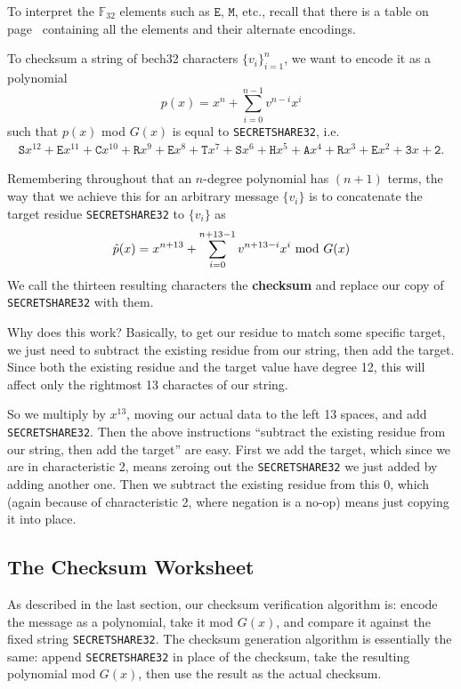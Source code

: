 \documentclass[letterpaper]{article}
\newcommand{\fttwo}{\mathbb{F}_{32}}
\newcommand{\vc}[1]{\texttt{#1}} %
\begin{document}
To interpret the $\fttwo$ elements such as $\vc{E}$, $\vc{M}$, etc., recall that
there is a table on page~\pageref{pg:f32table} containing all the elements and
their alternate encodings.

To checksum a string of bech32 characters $\{v_i\}_{i=1}^n$, we want to encode it
as a polynomial
\[ p(x) = x^n + \sum_{i=0}^{n-1} v^{n-i} x^i \]
such that $p(x)$ mod $G(x)$ is equal to \vc{SECRETSHARE32}, i.e.
\begin{align*}
\vc{S}x^{12} + \vc{E}x^{11} + \vc{C}x^{10} + \vc{R}x^9 + \vc{E}x^8 + \vc{T}x^7
    + \vc{S}x^6 + \vc{H}x^5 + \vc{A}x^4 + \vc{R}x^3 + \vc{E}x^2 + \vc{3}x + \vc{2}.
\end{align*}

Remembering throughout that an $n$-degree polynomial has $(n+1)$ terms, the way that
we achieve this for an arbitrary message $\{ v_i \}$ is to concatenate the target
residue \vc{SECRETSHARE32} to $\{ v_i \}$ as
\begin{equation}
 \hat{p}(x) = x^{n+13} + \sum_{i=0}^{n+13-1} v^{n+13-i} x^{i} \textnormal{ mod } G(x)
 \label{eq:modg}
\end{equation}
We call the thirteen resulting characters the \textbf{checksum} and replace our
copy of \vc{SECRETSHARE32} with them.

Why does this work? Basically, to get our residue to match some specific target, we
just need to subtract the existing residue from our string, then add the target. Since
both the existing residue and the target value have degree 12, this will affect only
the rightmost 13 charactes of our string.

So we multiply by $x^{13}$, moving our actual data to the left 13 spaces, and add
\vc{SECRETSHARE32}. Then the above instructions ``subtract the existing residue from
our string, then add the target'' are easy. First we add the target, which since we
are in characteristic 2, means zeroing out the \vc{SECRETSHARE32} we just added by
adding another one. Then we subtract the existing residue from this 0, which (again
because of characteristic 2, where negation is a no-op) means just copying it into place.

\subsection{The Checksum Worksheet}

As described in the last section, our checksum verification algorithm is: encode the
message as a polynomial, take it mod $G(x)$, and compare it against the fixed string
\vc{SECRETSHARE32}. The checksum generation algorithm is essentially the same:
append \vc{SECRETSHARE32} in place of the checksum, take the resulting polynomial
mod $G(x)$, then use the result as the actual checksum.
\end{document}
